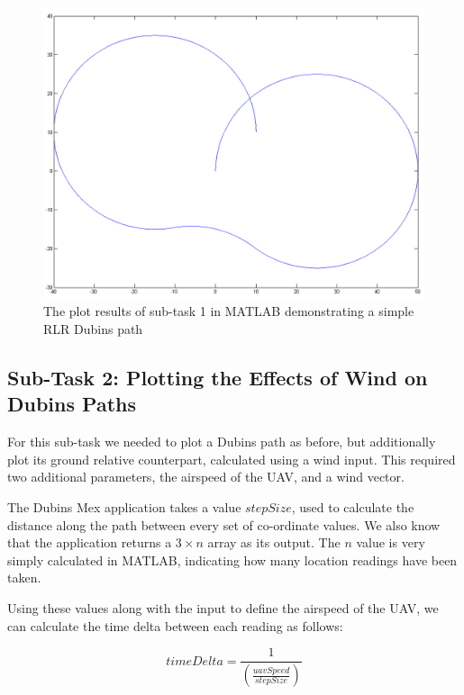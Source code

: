 \begin{figure}[htbp!] 
\centering    
\includegraphics[width=\textwidth]{PP1_Demo}
\caption[Task 1: Plotting Dubins Paths in MATLAB]{The plot results of sub-task 1 in MATLAB demonstrating a simple RLR Dubins path}
\label{fig:pp1demo}
\end{figure}

\subsection{Sub-Task 2: Plotting the Effects of Wind on Dubins Paths}
\label{task1:implementation:subtask2}

For this sub-task we needed to plot a Dubins path as before, but additionally plot its ground relative counterpart, calculated using a wind input. This required two additional parameters, the airspeed of the UAV, and a wind vector. 

The Dubins Mex application takes a value $stepSize$, used to calculate the distance along the path between every set of co-ordinate values. We also know that the application returns a $3 \times n$ array as its output. The $n$ value is very simply calculated in MATLAB, indicating how many location readings have been taken.

Using these values along with the input to define the airspeed of the UAV, we can calculate the time delta between each reading as follows:

\begin{equation}
	timeDelta = \frac{1}{(\frac{uavSpeed}{stepSize})}
\end{equation}

